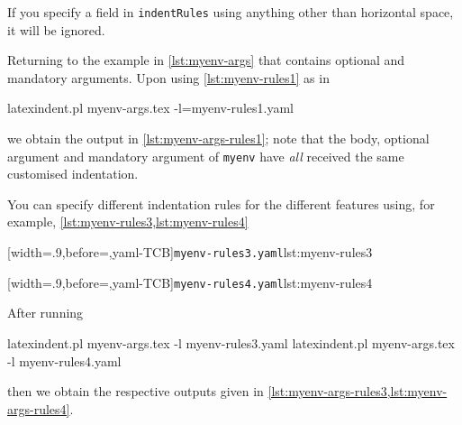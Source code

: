
 If you specify a field in \texttt{indentRules} using anything other than horizontal
 space, it will be ignored.

 Returning to the example in \cref{lst:myenv-args} that contains optional and mandatory
 arguments. Upon using \cref{lst:myenv-rules1} as in 
 \begin{commandshell}
latexindent.pl myenv-args.tex -l=myenv-rules1.yaml  
\end{commandshell}
 we obtain the output in \cref{lst:myenv-args-rules1}; note that the body, optional
 argument and mandatory argument of \texttt{myenv} have \emph{all} received the same
 customised indentation.

 You can specify different indentation rules for the different features using, for
 example, \cref{lst:myenv-rules3,lst:myenv-rules4}

 \begin{minipage}{.49\textwidth}
  [width=.9\linewidth,before=\centering,yaml-TCB]{\texttt{myenv-rules3.yaml}}{lst:myenv-rules3}
 \end{minipage}
 \hfill
 \begin{minipage}{.49\textwidth}
  [width=.9\linewidth,before=\centering,yaml-TCB]{\texttt{myenv-rules4.yaml}}{lst:myenv-rules4}
 \end{minipage}

 After running 
 \begin{commandshell}
latexindent.pl myenv-args.tex -l myenv-rules3.yaml  
latexindent.pl myenv-args.tex -l myenv-rules4.yaml  
\end{commandshell}
 then we obtain the respective outputs given in
 \cref{lst:myenv-args-rules3,lst:myenv-args-rules4}.

 \begin{widepage}
  \begin{minipage}{.5\textwidth}
  \end{minipage}%
  \hfill
  \begin{minipage}{.5\textwidth}
  \end{minipage}
 \end{widepage}

